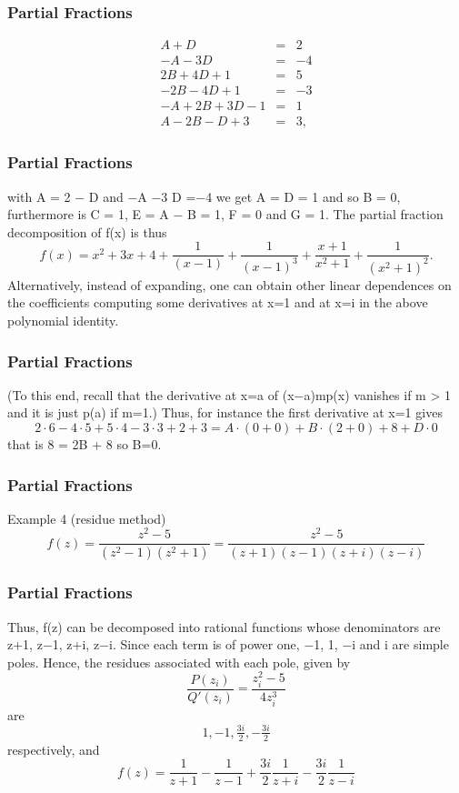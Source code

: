 \documentclass{beamer}
\begin{document}
\begin{frame}
\frametitle{Partial Fractions}

\begin{eqnarray}
 A + D &=& 2  \\
 -A - 3D &=&  -4 \\
2B + 4D + 1 &=& 5 \\
-2B - 4D + 1 &=& -3 \\
-A + 2B + 3D - 1 &=& 1 \\
A - 2B - D + 3 &=& 3 ,
\end{eqnarray}
\end{frame}
\begin{frame}
\frametitle{Partial Fractions}
with A = 2 − D and −A −3 D =−4 we get A = D = 1 and so B = 0, furthermore is C = 1, E = A − B = 1, F = 0 and G = 1.
The partial fraction decomposition of ƒ(x) is thus
\[f(x)=x^2+3x+4+\frac{1}{(x-1)} + \frac{1}{(x - 1)^3} + \frac{x + 1}{x^2+1}+\frac{1}{(x^2+1)^2}.\]
Alternatively, instead of expanding, one can obtain other linear dependences on the coefficients computing 
some derivatives at x=1 and at x=i in the above polynomial identity. 
\end{frame}
\begin{frame}
\frametitle{Partial Fractions}
(To this end, recall that the derivative at x=a of (x−a)mp(x) vanishes if m > 1 and it is just p(a) if m=1.) Thus, for instance the first derivative at x=1 gives
 \[2\cdot6-4\cdot5+5\cdot4-3\cdot3+2+3   = A\cdot(0+0) + B\cdot( 2+ 0) + 8 + D\cdot0 \]
that is 8 = 2B + 8 so B=0.
\end{frame}
\begin{frame}
\frametitle{Partial Fractions}
Example 4 (residue method)
 \[f(z)=\frac{z^{2}-5}{(z^2-1)(z^2+1)}=\frac{z^{2}-5}{(z+1)(z-1)(z+i)(z-i)}\]
\end{frame}
\begin{frame}
\frametitle{Partial Fractions}
Thus, f(z) can be decomposed into rational functions whose denominators are z+1, z−1, z+i, z−i. Since each term is of power one, −1, 1, −i and i are simple poles.
Hence, the residues associated with each pole, given by
\[
\frac{P(z_i)}{Q'(z_i)} = \frac{z_i^2 - 5}{4z_i^3}\]
are
\[ 1, -1, \tfrac{3i}{2}, -\tfrac{3i}{2}\]
respectively, and
\[ f(z)=\frac{1}{z+1}-\frac{1}{z-1}+\frac{3i}{2}\frac{1}{z+i}-\frac{3i}{2}\frac{1}{z-i}\]

\end{frame}
\end{document}
